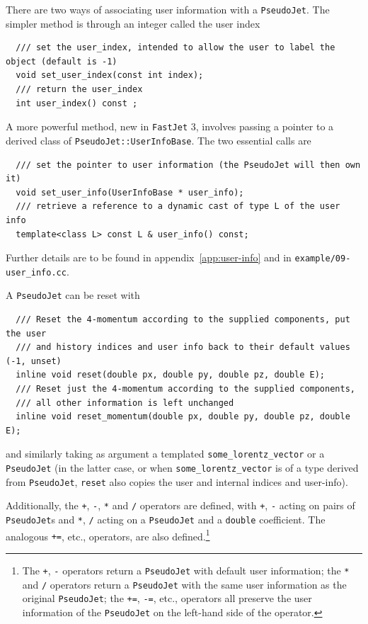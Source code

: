 \documentclass[12pt,a4]{article}
\newcommand{\fastjet}{\texttt{FastJet}\xspace}
\newcommand{\ttt}[1]{{\small\texttt{#1}}}
\begin{document}
There are two ways of associating user information with a
\ttt{PseudoJet}.
%
The simpler method is through an integer called the user index
\begin{lstlisting}
  /// set the user_index, intended to allow the user to label the object (default is -1)
  void set_user_index(const int index);
  /// return the user_index
  int user_index() const ;
\end{lstlisting}
A more powerful method, new in \fastjet 3, involves passing a pointer to a derived class
of \ttt{PseudoJet::UserInfoBase}. The two essential calls are
\begin{lstlisting}
  /// set the pointer to user information (the PseudoJet will then own it)
  void set_user_info(UserInfoBase * user_info);
  /// retrieve a reference to a dynamic cast of type L of the user info
  template<class L> const L & user_info() const;
\end{lstlisting}
Further details are to be found in appendix~\ref{app:user-info} and in
\ttt{example/09-user\_info.cc}.

A \verb:PseudoJet: can be reset with
\begin{lstlisting}
  /// Reset the 4-momentum according to the supplied components, put the user
  /// and history indices and user info back to their default values (-1, unset) 
  inline void reset(double px, double py, double pz, double E);
  /// Reset just the 4-momentum according to the supplied components,
  /// all other information is left unchanged
  inline void reset_momentum(double px, double py, double pz, double E);
\end{lstlisting}
and similarly taking as argument a templated
\verb:some_lorentz_vector: or a \verb:PseudoJet: (in the latter case,
or when \verb:some_lorentz_vector: is of a type derived from
\verb:PseudoJet:, \ttt{reset} also copies the user and internal indices and
user-info).

Additionally, the \ttt{+}, \ttt{-}, \ttt{*} and \ttt{/} operators are
defined, with \ttt{+}, \ttt{-} acting on pairs of \ttt{PseudoJet}s and
\ttt{*}, \ttt{/} acting on a \ttt{PseudoJet} and a \ttt{double}
coefficient.
%
The analogous \ttt{+=}, etc., operators, are also defined.\footnote{
  The \texttt{+}, \texttt{-} operators return a \texttt{PseudoJet}
  with default user information; the \texttt{*} and \texttt{/} operators
  return a \texttt{PseudoJet} with the same user information as the
  original \texttt{PseudoJet}; the 
  \texttt{+=}, \texttt{-=}, etc., operators all preserve the user
  information of the \texttt{PseudoJet} on the left-hand side of the operator.  }
\end{document}
